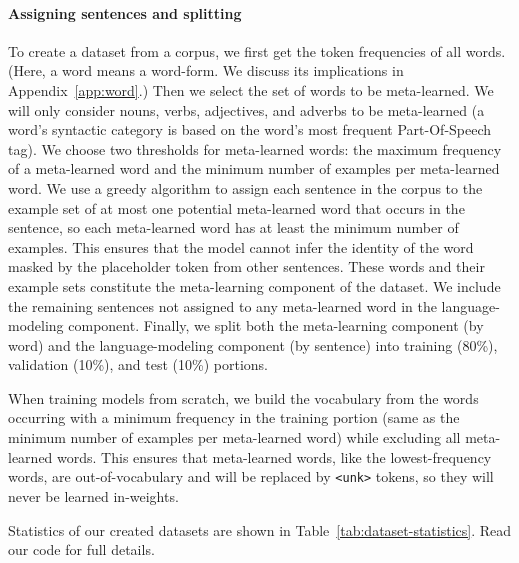 \documentclass{article}
\begin{document}
\paragraph{Assigning sentences and splitting}
To create a dataset from a corpus, we first get the token frequencies of all words. (Here, a word means a word-form. We discuss its implications in Appendix~\ref{app:word}.)
Then we select the set of words to be meta-learned.
We will only consider nouns, verbs, adjectives, and adverbs to be meta-learned (a word's syntactic category is based on the word's most frequent Part-Of-Speech tag).
We choose two thresholds for meta-learned words: the maximum frequency of a meta-learned word and the minimum number of examples per meta-learned word.
We use a greedy algorithm to assign each sentence in the corpus to the example set of at most one potential meta-learned word that occurs in the sentence, so each meta-learned word has at least the minimum number of examples. This ensures that the model cannot infer the identity of the word masked by the placeholder token from other sentences. These words and their example sets constitute the meta-learning component of the dataset.
We include the remaining sentences not assigned to any meta-learned word in the language-modeling component.
Finally, we split both the meta-learning component (by word) and the language-modeling component (by sentence) into training (80\%), validation (10\%), and test (10\%) portions.

When training models from scratch, we build the vocabulary from the words occurring with a minimum frequency in the training portion (same as the minimum number of examples per meta-learned word) while excluding all meta-learned words. This ensures that meta-learned words, like the lowest-frequency words, are out-of-vocabulary and will be replaced by \texttt{<unk>} tokens, so they will never be learned in-weights.

Statistics of our created datasets are shown in Table~\ref{tab:dataset-statistics}.
Read our code for full details.
\end{document}
